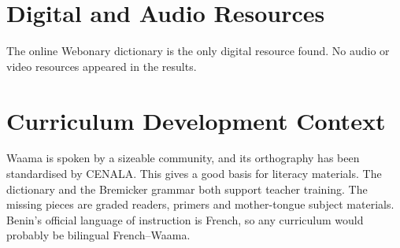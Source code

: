 \documentclass[12pt]{article}
\begin{document}
\section{Digital and Audio Resources}
The online Webonary dictionary is the only digital resource found. No audio or video resources appeared in the results.

\section{Curriculum Development Context}
Waama is spoken by a sizeable community, and its orthography has been standardised by CENALA. This gives a good basis for literacy materials. The dictionary and the Bremicker grammar both support teacher training. The missing pieces are graded readers, primers and mother-tongue subject materials. Benin's official language of instruction is French, so any curriculum would probably be bilingual French--Waama.
\end{document}
